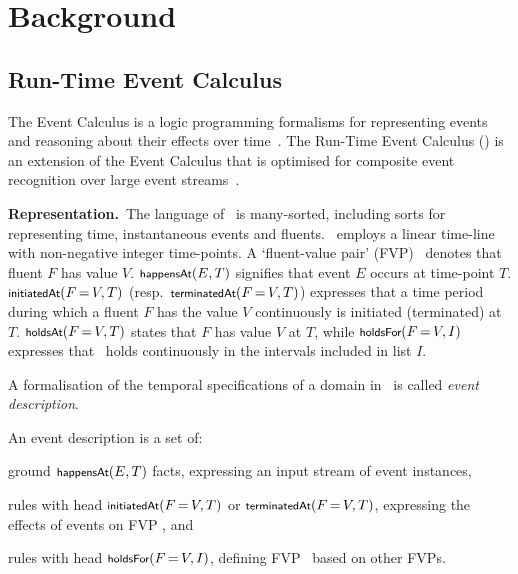 \section{Background}\label{sec:background}

\subsection{Run-Time Event Calculus}

The Event Calculus is a logic programming formalisms for representing events and reasoning about their effects over time~\cite{kowalski86}.
%
The Run-Time Event Calculus (\rtec) is an extension of the Event Calculus that is optimised for composite event recognition over large event streams~\cite{DBLP:journals/tkde/ArtikisSP15,DBLP:conf/kr/MantenoglouPA22,DBLP:conf/kr/MantenoglouKA23}.

\textbf{Representation.}~The language of \rtec\ is many-sorted, including sorts for representing time, instantaneous events and fluents. %
%
\rtec\ employs a linear time-line with non-negative integer time-points.
%
A `fluent-value pair' (FVP) \fv\ denotes that fluent $F$ has value $V$.
%
%
%
%
%
$\happensAt(E, T)$ signifies that event $E$ occurs at time-point $T$.
%
$\initiatedAt(F\val V, T)$ (resp.~$\terminatedAt(F\val V, T)$) expresses that a time period during which a fluent $F$ has the value $V$ continuously is initiated (terminated) at $T$.
%
$\holdsAt(F\val V, T)$ states that $F$ has value $V$ at $T$, while $\holdsFor(F\val V, I)$ expresses that \fv\ holds continuously in the intervals included in list $I$.

A formalisation of the temporal specifications of a domain in \rtec\ is called \emph{event description}.
%
\begin{definition}\label{def:event_description}
An event description is a set of:
%
\begin{compactitem}
\item ground $\happensAt(E, T)$ facts, expressing an input stream of event instances, 
\item rules with head $\initiatedAt(F\val V, T)$ or $\terminatedAt(F\val V, T)$, expressing the effects of events on FVP \fv, and
\item rules with head $\holdsFor(F\val V, I)$, defining FVP \fv\ based on other FVPs. \qeddef  %
\end{compactitem}
%
\end{definition}

